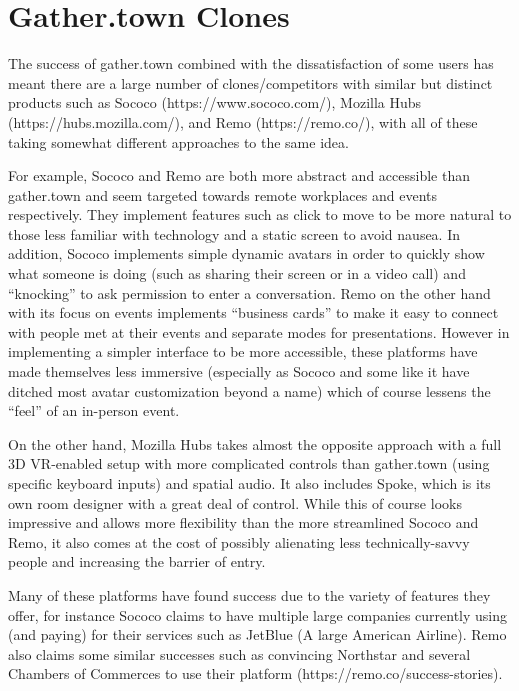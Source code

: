 \documentclass[bsc,frontabs,singlespacing,parskip,deptreport]{infthesis}
\begin{document}
\section{Gather.town Clones}

The success of gather.town combined with the dissatisfaction of some users has meant there are a large number of clones/competitors with similar but distinct products such as Sococo (https://www.sococo.com/), Mozilla Hubs (https://hubs.mozilla.com/), and Remo (https://remo.co/), with all of these taking somewhat different approaches to the same idea.

For example, Sococo and Remo are both more abstract and accessible than gather.town and seem targeted towards remote workplaces and events respectively.  They implement features such as click to move to be more natural to those less familiar with technology and a static screen to avoid nausea.  In addition, Sococo implements simple dynamic avatars in order to quickly show what someone is doing (such as sharing their screen or in a video call) and “knocking” to ask permission to enter a conversation.  Remo on the other hand with its focus on events implements “business cards” to make it easy to connect with people met at their events and separate modes for presentations.  However in implementing a simpler interface to be more accessible, these platforms have made themselves less immersive (especially as Sococo and some like it have ditched most avatar customization beyond a name) which of course lessens the “feel” of an in-person event.

On the other hand, Mozilla Hubs takes almost the opposite approach with a full 3D VR-enabled setup with more complicated controls than gather.town (using specific keyboard inputs) and spatial audio.  It also includes Spoke, which is its own room designer with a great deal of control.  While this of course looks impressive and allows more flexibility than the more streamlined Sococo and Remo, it also comes at the cost of possibly alienating less technically-savvy people and increasing the barrier of entry.

Many of these platforms have found success due to the variety of features they offer, for instance Sococo claims to have multiple large companies currently using (and paying) for their services such as JetBlue (A large American Airline). Remo also claims some similar successes such as convincing Northstar and several Chambers of Commerces to use their platform (https://remo.co/success-stories).
\end{document}
